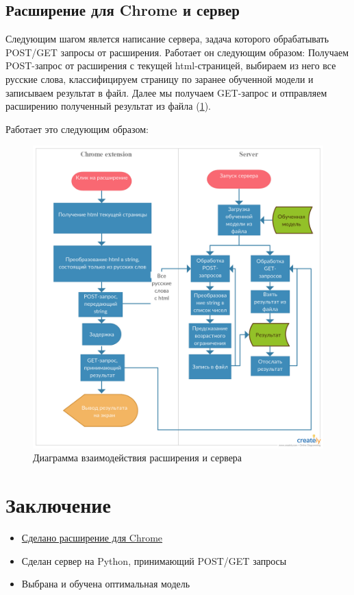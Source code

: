 \documentclass[14pt]{matmex-diploma}
\begin{document}
    
    \subsection{Расширение для Chrome и сервер}
    
        Следующим шагом явлется написание сервера, задача которого обрабатывать POST/GET запросы от расширения. Работает он следующим образом:
        Получаем POST-запрос от расширения с текущей html-страницей, выбираем из него все русские слова, классифицируем страницу по заранее обученной
        модели и записываем результат в файл. Далее мы получаем GET-запрос и отправляем расширению полученный результат из файла (\ref{uml}).
    
        Работает это следующим образом:
        \begin{figure}[h]
            \centering
        	\includegraphics[scale=0.22]{images/uml.png}
        	\caption{Диаграмма взаимодействия расширения и сервера}
        	\label{uml}
        \end{figure}     
        
\section*{Заключение}        

        \begin{itemize}
            \item \href{https://github.com/SmirnovAlexander/PoemClassifier}{Сделано расширение для Chrome}
            \item Сделан сервер на Python, принимающий POST/GET запросы
            \item Выбрана и обучена оптимальная модель 
        \end{itemize}


\setmonofont[Mapping=tex-text]{CMU Typewriter Text}


\end{document}
